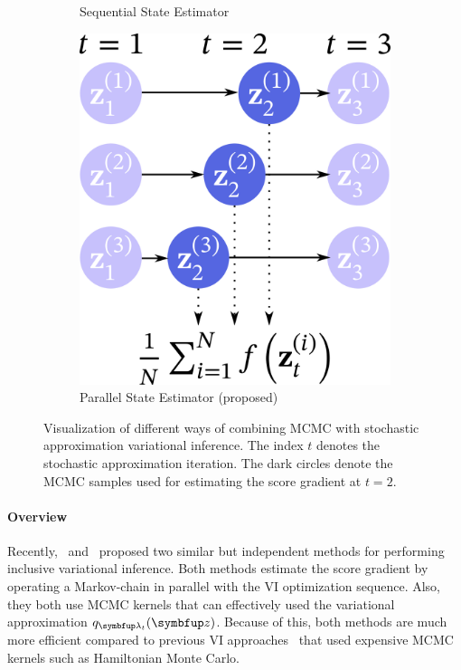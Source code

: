 \begin{figure}
\begin{subfigure}[b]{0.35\textwidth}
        \caption{Sequential State Estimator}\label{fig:seq}
    \end{subfigure}
    \begin{subfigure}[b]{0.3\textwidth}
        \centering
        \includegraphics[scale=0.25]{figures/diagram_3.png}
        \caption{Parallel State Estimator (proposed)}\label{fig:par}
    \end{subfigure}
    \caption{Visualization of different ways of combining MCMC with stochastic approximation variational inference.
    The index \(t\) denotes the stochastic approximation iteration.
    The dark circles denote the MCMC samples used for estimating the score gradient at \(t=2\).
    }\label{fig:overview}
\end{figure}

\paragraph{Overview}
Recently,~\citet{NEURIPS2020_b2070693} and~\citet{pmlr-v124-ou20a} proposed two similar but independent methods for performing inclusive variational inference.
Both methods estimate the score gradient by operating a Markov-chain in parallel with the VI optimization sequence.
Also, they both use MCMC kernels that can effectively used the variational approximation \(q_{\vlambda_t}(\vz)\).
Because of this, both methods are much more efficient compared to previous VI approaches~\citep{pmlr-v97-ruiz19a, pmlr-v70-hoffman17a} that used expensive MCMC kernels such as Hamiltonian Monte Carlo.

